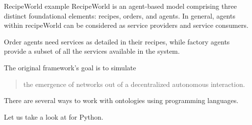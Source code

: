 \begin{frame}[fragile]{\insertsection}
    \begin{block}{RecipeWorld example}
        RecipeWorld \cite{Fontana2015recipeWorld} is an agent-based model comprising three distinct foundational elements: recipes, orders, and agents. In general, agents within recipeWorld can be considered as \alert{service providers} and \alert{service consumers}.

        \medskip
        \alert{Order} agents need services as detailed in their recipes, while \alert{factory} agents provide a subset of all the services available in the system.

        \medskip
        The original framework's goal is to simulate \blockquote[\cite{Fontana2015recipeWorld}]{the emergence of networks out of a decentralized autonomous interaction.}
    \end{block}
\end{frame}


\begin{frame}{\insertsection}
    There are several ways to work with ontologies using programming languages. 
    
    Let us take a look at  for Python.
\end{frame}

